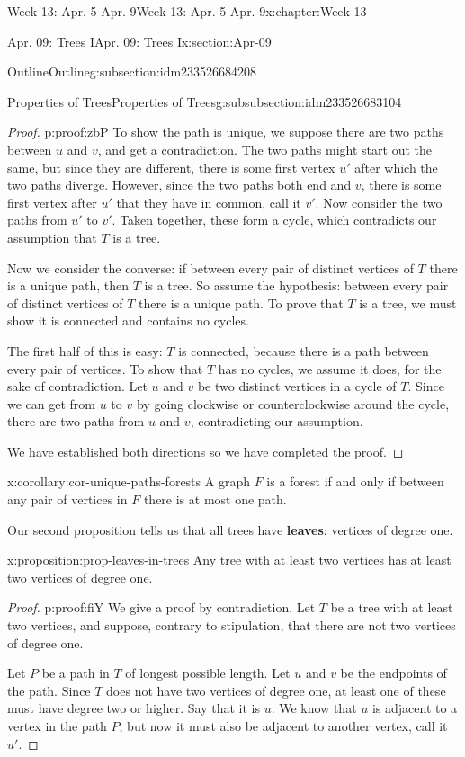 \documentclass[oneside,10pt,]{book}
\newcommand{\terminology}[1]{\textbf{#1}}
\numberwithin{equation}{section}
\begin{document}
\begin{chapterptx}{Week 13: Apr. 5-Apr. 9}{}{Week 13: Apr. 5-Apr. 9}{}{}{x:chapter:Week-13}
\begin{sectionptx}{Apr. 09: Trees I}{}{Apr. 09: Trees I}{}{}{x:section:Apr-09}
\begin{subsectionptx}{Outline}{}{Outline}{}{}{g:subsection:idm233526684208}
\begin{subsubsectionptx}{Properties of Trees}{}{Properties of Trees}{}{}{g:subsubsection:idm233526683104}
\begin{proof}{}{p:proof:zbP}
To show the path is unique, we suppose there are two paths between \(u\) and \(v\), and get a contradiction.  The two paths might start out the same, but since they are different, there is some first vertex \(u'\) after which the two paths diverge.  However, since the two paths both end and \(v\), there is some first vertex after \(u'\) that they have in common, call it \(v'\).  Now consider the two paths from \(u'\) to \(v'\).  Taken together, these form a cycle, which contradicts our assumption that \(T\) is a tree.%
\par
Now we consider the converse: if between every pair of distinct vertices of \(T\) there is a unique path, then \(T\) is a tree.  So assume the hypothesis: between every pair of distinct vertices of \(T\) there is a unique path.  To prove that \(T\) is a tree, we must show it is connected and contains no cycles.%
\par
The first half of this is easy: \(T\) is connected, because there is a path between every pair of vertices.  To show that \(T\) has no cycles, we assume it does, for the sake of contradiction.  Let \(u\) and \(v\) be two distinct vertices in a cycle of \(T\).  Since we can get from \(u\) to \(v\) by going clockwise or counterclockwise around the cycle, there are two paths from \(u\) and \(v\), contradicting our assumption.%
\par
We have established both directions so we have completed the proof.%
\end{proof}
\begin{corollary}{}{}{x:corollary:cor-unique-paths-forests}%
A graph \(F\) is a forest if and only if between any pair of vertices in \(F\) there is at most one path.%
\end{corollary}
 Our second proposition tells us that all trees have \terminology{leaves}: vertices of degree one.%
\begin{proposition}{}{}{x:proposition:prop-leaves-in-trees}%
Any tree with at least two vertices has at least two vertices of degree one.%
\end{proposition}
\begin{proof}{}{p:proof:fiY}
We give a proof by contradiction.  Let \(T\) be a tree with at least two vertices, and suppose, contrary to stipulation, that there are not two vertices of degree one.%
\par
Let \(P\) be a path in \(T\) of longest possible length.  Let \(u\) and \(v\) be the endpoints of the path.  Since \(T\) does not have two vertices of degree one, at least one of these must have degree two or higher.  Say that it is \(u\).  We know that \(u\) is adjacent to a vertex in the path \(P\), but now it must also be adjacent to another vertex, call it \(u'\).%

\end{proof}
\end{subsubsectionptx}
\end{subsectionptx}
\end{sectionptx}
\end{chapterptx}
\end{document}
